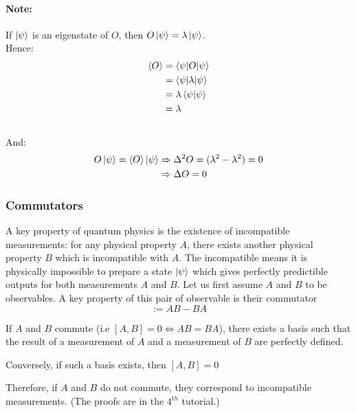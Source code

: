 \documentclass{article}
\begin{document}
\paragraph{Note:} If $\ket{\psi}$ is an eigenstate of $O$, then $O\ket{\psi} =
\lambda \ket{\psi}$. \\
Hence:
\begin{equation}
    \begin{aligned}
        \braket{O}
            & = \braket{\psi | O | \psi} \\
            & = \braket{\psi | \lambda | \psi} \\
            & = \lambda\braket{\psi|\psi } \\
            & = \lambda
    \end{aligned}
\end{equation}
\\
And:
\begin{equation}
    \begin{aligned}
        O\ket{\psi} = \braket{O} \ket{\psi}
            & \Rightarrow \Delta^2 O = (\lambda^2 - \lambda^2) = 0 \\
            & \Rightarrow \Delta O = 0
    \end{aligned}
\end{equation}

\subsubsection*{Commutators}
A key property of quantum physics is the existence of incompatible measurements:
for any physical property $A$, there exists another physical property $B$ which
is incompatible with $A$. The incompatible means it is physically impossible to
prepare a state $\ket{\psi}$ which gives perfectly predictible outputs for both
measurements $A$ and $B$. Let us first assume $A$ and $B$ to be observables. A
key property of this pair of observable is their commutator
\begin{equation}
    [A,B]:= AB-BA
\end{equation}

If $A$ and $B$ commute (i.e $[A,B]=0 \Leftrightarrow AB = BA$), there exists a
basis such that the result of a measurement of $A$ and a measurement of $B$ are
perfectly defined.

Conversely, if such a basis exists, then $[A,B]=0$

Therefore, if $A$ and $B$ do not commute, they correspond to incompatible
measurements. (The proofs are in the $4^{th}$ tutorial.)
\end{document}
